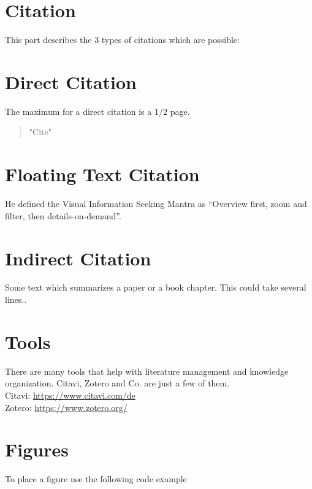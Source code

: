 \section{Citation}

This part describes the 3 types of citations which are possible:

\section{Direct Citation}

The maximum for a direct citation is a ${1/2}$ page.

\begin{quote}
    "Cite"\cite{Verma.2021}
\end{quote}

\section{Floating Text Citation}

He defined the Visual Information Seeking Mantra as ``Overview first, zoom and filter, then details-on-demand''.\cite{Verma.2021}

\section{Indirect Citation}

Some text which summarizes a paper or a book chapter. This could take several lines.\cite{Verma.2021}. 

\section{Tools}

There are many tools that help with literature management and knowledge organization. Citavi, Zotero and Co. are just a few of them.\\

Citavi: \url{https://www.citavi.com/de}\\
Zotero: \url{https://www.zotero.org/}

\newpage
\section{Figures}

To place a figure use the following code example

